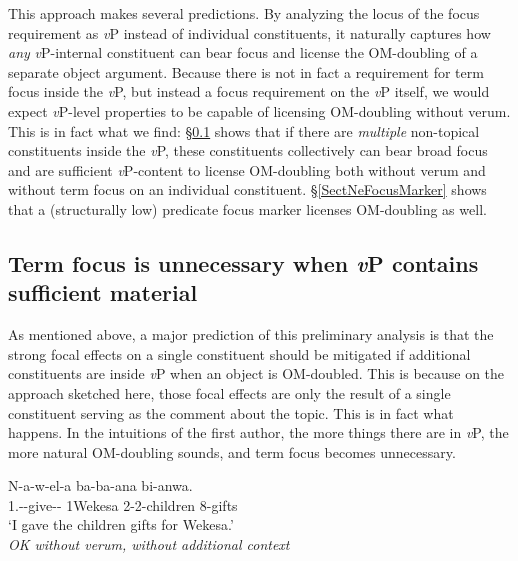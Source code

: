 \documentclass[output=paper]{langscibook}
\begin{document}
This approach makes several predictions. By analyzing the locus of the focus requirement as \textit{v}P instead of individual constituents, it naturally captures how \textit{any} \textit{v}P-internal constituent can bear focus and license the OM-doubling of a separate object argument. Because there is not in fact a requirement for  term focus inside the \textit{v}P, but instead a focus requirement on the \textit{v}P itself, we would expect \textit{v}P-level properties to be capable of licensing OM-doubling without verum. This is in fact what we find: \S \ref{SectDoublingWithoutFocus} shows that if there are \textit{multiple} non-topical constituents inside the \textit{v}P, these constituents collectively can bear broad focus and are sufficient \textit{v}P-content to license OM-doubling both without verum and without term focus on an individual constituent. \S \ref{SectNeFocusMarker} shows that a (structurally low) predicate focus marker licenses OM-doubling as well.

\subsection{Term focus is unnecessary when \textit{v}P contains sufficient material} \label{SectDoublingWithoutFocus}

As mentioned above, a major prediction of this preliminary analysis is that the strong focal effects on a single constituent should be mitigated if additional constituents are inside \textit{v}P when an object is OM-doubled. This is because on the approach sketched here, those focal effects are only the result of a single constituent serving as the comment about the topic. This is in fact what happens. In the intuitions of the first author, the more things there are in \textit{v}P, the more natural OM-doubling sounds, and term focus becomes unnecessary.

\ea 


\gll N-a-w-el-a  ba-ba-ana bi-anwa. \\
1\Sg.\Sm-\Om-give-\Appl-\Fv{} 1Wekesa 2-2-children 8-gifts \\
\glt `I gave the children gifts for Wekesa.' \\ \textit{OK without verum, without additional context}
\end{document}
